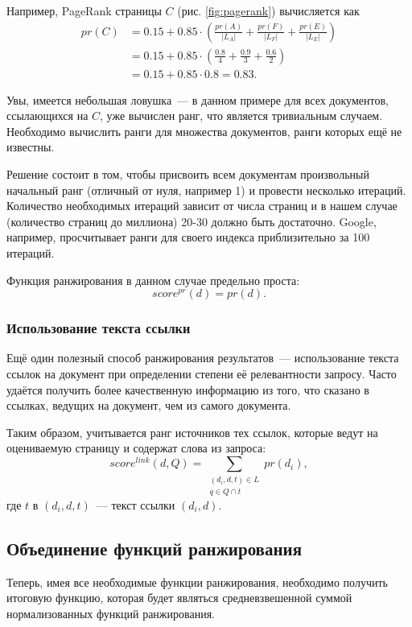 Например, PageRank страницы $C$ (рис. \ref{fig:pagerank}) вычисляется как
\begin{equation}
  \begin{split}
    pr(C) &= 0.15 + 0.85\cdot\left(\frac{pr(A)}{|L_A|}+\frac{pr(F)}{|L_F|}+\frac{pr(E)}{|L_E|}\right)\\
    &= 0.15 + 0.85\cdot\left(\frac{0.8}{4}+\frac{0.9}{3}+\frac{0.6}{2}\right)\\
    &= 0.15 + 0.85\cdot 0.8 = 0.83.
  \end{split}
\end{equation}

Увы, имеется небольшая ловушка~--- в данном примере для всех документов, ссылающихся на $C$, уже вычислен ранг, что является тривиальным случаем. Необходимо вычислить ранги для множества документов, ранги которых ещё не известны.

Решение состоит в том, чтобы присвоить всем документам произвольный начальный ранг (отличный от нуля, например 1) и провести несколько итераций. Количество необходимых итераций зависит от числа страниц и в нашем случае (количество страниц до миллиона) 20-30 должно быть достаточно. Google, например, просчитывает ранги для своего индекса приблизительно за 100 итераций.

Функция ранжирования в данном случае предельно проста:
\begin{equation}
  score^{pr}(d) = pr(d).
\end{equation}


\subsubsection{Использование текста ссылки}
Ещё один полезный способ ранжирования результатов~--- использование текста ссылок на документ при определении степени её релевантности запросу. Часто удаётся получить более качественную информацию из того, что сказано в ссылках, ведущих на документ, чем из самого документа.

Таким образом, учитывается ранг источников тех ссылок, которые ведут на оцениваемую страницу и содержат слова из запроса:
\begin{equation}
  score^{link}(d, Q) = \sum_{\substack{(d_i, d, t)\in L \\ q\in Q\cap t}} pr(d_i),
\end{equation}
где $t$ в $(d_i, d, t)$~--- текст ссылки $(d_i, d)$.


\subsection{Объединение функций ранжирования}
Теперь, имея все необходимые функции ранжирования, необходимо получить итоговую функцию, которая будет являться средневзвешенной суммой нормализованных функций ранжирования.


